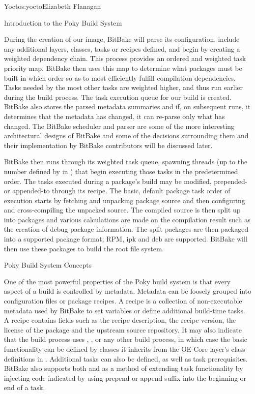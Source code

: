 \begin{aosachapter}{Yocto}{s:yocto}{Elizabeth Flanagan}
\begin{aosasect1}{Introduction to the Poky Build System}

During the creation of our image, BitBake will parse its
configuration, include any additional layers, classes, tasks or
recipes defined, and begin by creating a weighted dependency
chain. This process provides an ordered and weighted task priority
map. BitBake then uses this map to determine what packages must be
built in which order so as to most efficiently fulfill compilation
dependencies. Tasks needed by the most other tasks are weighted higher,
and thus run earlier during the build process. The task execution
queue for our build is created. BitBake also stores the parsed
metadata summaries and if, on subsequent runs, it determines that the
metadata has changed, it can re-parse only what has changed. The
BitBake scheduler and parser are some of the more interesting
architectural designs of BitBake and some of the decisions surrounding
them and their implementation by BitBake contributors will
be discussed later.

BitBake then runs through its weighted task queue, spawning threads
(up to the number defined by  in
) that begin executing those tasks in the
predetermined order. The tasks executed during a package's build may
be modified, prepended- or appended-to through its recipe. The basic,
default package task order of execution starts by fetching and
unpacking package source and then configuring and cross-compiling the
unpacked source. The compiled source is then split up into packages
and various calculations are made on the compilation result such as
the creation of debug package information.  The split packages are
then packaged into a supported package format; RPM, ipk and deb 
are supported. BitBake will then use these packages to build
the root file system.

\begin{aosasect2}{Poky Build System Concepts}

One of the most powerful properties of the
Poky build system is that every aspect of a build is controlled by
metadata. Metadata can be loosely grouped into configuration files or
package recipes. A recipe is a
collection of non-executable
metadata used by BitBake to set variables or define additional 
build-time tasks. A recipe contains fields such as the recipe description,
the recipe version, the license of the package and the upstream
source repository. It may also indicate
that the build process uses , ,  or any
other build process, in which case the basic functionality can be
defined by classes it inherits from
the OE-Core layer's class definitions in .
Additional tasks can also be
defined, as well as task prerequisites. BitBake
also supports both 
and  as a method of extending task functionality by injecting
code indicated by using prepend or append suffix into the beginning
or end of a task.


\end{aosasect2}
\end{aosasect1}
\end{aosachapter}
